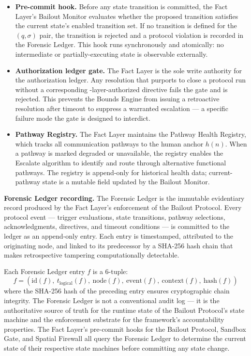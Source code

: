\begin{itemize}\itemsep=0pt
\item[(\textit{i})] \textbf{Pre-commit hook.} Before any state transition is committed, the Fact Layer's Bailout Monitor evaluates whether the proposed transition satisfies the current state's enabled transition set. If no transition is defined for the $(q, \sigma)$ pair, the transition is rejected and a protocol violation is recorded in the Forensic Ledger. This hook runs synchronously and atomically: no intermediate or partially-executing state is observable externally.

\item[(\textit{ii})] \textbf{Authorization ledger gate.} The Fact Layer is the sole write authority for the authorization ledger. Any resolution that purports to close a protocol run without a corresponding \purpose-layer-authorized directive fails the gate and is rejected. This prevents the Bounds Engine from issuing a retroactive resolution after timeout to suppress a warranted escalation --- a specific failure mode the gate is designed to interdict.

\item[(\textit{iii})] \textbf{Pathway Registry.} The Fact Layer maintains the Pathway Health Registry, which tracks all communication pathways to the human anchor $h(n)$. When a pathway is marked degraded or unavailable, the registry enables the Escalate algorithm to identify and route through alternative functional pathways. The registry is append-only for historical health data; current-pathway state is a mutable field updated by the Bailout Monitor.
\end{itemize}

\medskip\noindent\textbf{Forensic Ledger recording.} The Forensic Ledger is the immutable evidentiary record produced by the Fact Layer's enforcement of the Bailout Protocol. Every protocol event --- trigger evaluations, state transitions, pathway selections, acknowledgments, directives, and timeout conditions --- is committed to the ledger as an append-only entry. Each entry is timestamped, attributed to the originating node, and linked to its predecessor by a SHA-256 hash chain that makes retrospective tampering computationally detectable.

Each Forensic Ledger entry $f$ is a 6-tuple:
\begin{equation}
f = (\text{id}(f),\ t_{\text{logical}}(f),\ \text{node}(f),\ \text{event}(f),\ \text{context}(f),\ \text{hash}(f))
\end{equation}
where the SHA-256 hash of the preceding entry ensures cryptographic chain integrity. The Forensic Ledger is not a conventional audit log --- it is the authoritative source of truth for the runtime state of the Bailout Protocol's state machine and the enforcement substrate for the framework's accountability properties. The Fact Layer's pre-commit hooks for the Bailout Protocol, Sandbox Gate, and Spatial Firewall all query the Forensic Ledger to determine the current state of their respective state machines before committing any state change.

